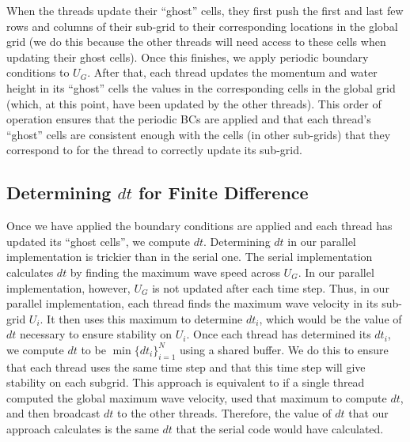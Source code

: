 \documentclass{article}
\begin{document}
When the threads update their ``ghost'' cells, they first push the first and last few rows and columns of their sub-grid to their corresponding locations in the global grid
(we do this because the other threads will need access to these cells when updating their ghost cells).
Once this finishes, we apply periodic boundary conditions to $U_G$.
After that, each thread updates the momentum and water height in its ``ghost'' cells the values in the corresponding cells in the global grid (which, at this point, have been updated by the other threads).
This order of operation ensures that the periodic BCs are applied and that each thread's ``ghost'' cells are consistent enough with the cells (in other sub-grids) that they correspond to for the thread to correctly update its sub-grid.

\subsection{Determining $dt$ for Finite Difference}
Once we have applied the boundary conditions are applied and each thread has updated its ``ghost cells'',
we compute $dt$.
Determining $dt$ in our parallel implementation is trickier than in the serial one.
The serial implementation calculates $dt$ by finding the maximum wave speed across $U_G$.
In our parallel implementation, however, $U_G$ is not updated after each time step.
Thus, in our parallel implementation, each thread finds the maximum wave velocity in its sub-grid $U_i$.
It then uses this maximum to determine $dt_i$, which would be the value of $dt$ necessary to ensure stability on $U_i$.
Once each thread has determined its $dt_i$, we compute $dt$ to be $\min\{dt_i\}_{i=1}^N$ using a shared buffer.
We do this to ensure that each thread uses the same time step and that this time step will give stability on each subgrid.
This approach is equivalent to if a single thread computed the global maximum wave velocity, used that maximum to compute $dt$, and then broadcast $dt$ to the other threads.
Therefore, the value of $dt$ that our approach calculates is the same $dt$ that the serial code would have calculated.
\end{document}
